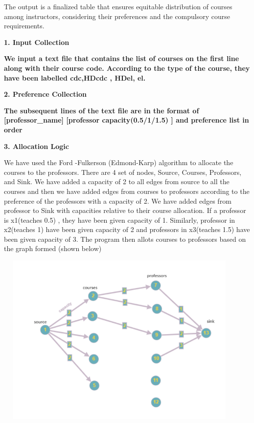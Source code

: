 \documentclass{article} %
\begin{document}
\noindent The output is a finalized table that ensures equitable distribution of courses among instructors, considering their preferences and the compulsory course requirements.

\noindent 

\noindent \textbf{}

\noindent \textbf{1. Input Collection}

\noindent \textbf{We input a text file that contains the list of courses on the first line along with their course code. According to the type of the course, they have been labelled cdc,HDcdc , HDel, el.}

\noindent \textbf{}

\noindent \textbf{2. Preference Collection}

\noindent \textbf{The subsequent lines of the text file are in the format of [professor\_name]   [professor capacity(0.5/1/1.5) ]  and preference list in order }

\noindent \textbf{}

\noindent \textbf{3. Allocation Logic}

\noindent We have used the Ford -Fulkerson (Edmond-Karp) algorithm to allocate the courses to the professors. There are 4 set of nodes, Source, Courses, Professors, and Sink.  We have added a capacity of 2 to all edges from source to all the courses and then we have added edges from courses to professors according to the preference of the professors with a capacity of 2.  We have added edges from professor to Sink with capacities relative to their course allocation. If a professor is x1(teaches 0.5) , they have been given capacity of 1. Similarly, professor in x2(teaches 1) have been given capacity of 2 and professors in x3(teaches 1.5) have been given capacity of 3. The program then allots courses to professors based on the graph formed (shown below)

\noindent \textbf{                   }\includegraphics*[width=4.92in, height=3.38in]{image2}\textbf{}
\end{document}
